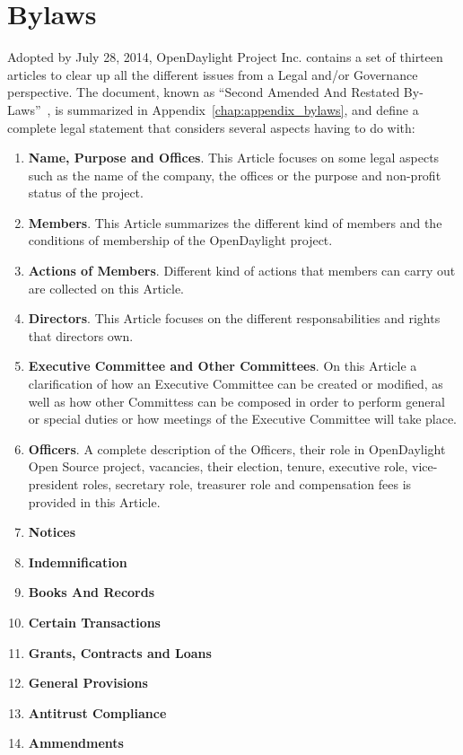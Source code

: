 \documentclass[a4paper, 12pt]{book}
\begin{document}
\section{Bylaws}
\label{sec:bylaws}
Adopted by July 28, 2014, OpenDaylight Project Inc. contains a set of thirteen articles to clear up all the different issues from a Legal and/or Governance perspective. The document, known as ``Second Amended And Restated By-Laws''~\cite{OpenDaylightBylaws}, is summarized in Appendix~\ref{chap:appendix_bylaws}, and define a complete legal statement that considers several aspects having to do with:
\begin{enumerate}\itemsep0pt
 \item{\textbf{Name, Purpose and Offices}}. This Article focuses on some legal aspects such as the name of the company, the offices or the purpose and non-profit status of the project.
 \item{\textbf{Members}}.  This Article summarizes the different kind of members and the conditions of membership of the OpenDaylight project.
 \item{\textbf{Actions of Members}}. Different kind of actions that members can carry out are collected on this Article.
 \item{\textbf{Directors}}. This Article focuses on the different responsabilities and rights that directors own.
 \item{\textbf{Executive Committee and Other Committees}}. On this Article a clarification of how an Executive Committee can be created or modified, as well as how other Committess can be composed in order to perform general or special duties or how meetings of the Executive Committee will take place.
 \item{\textbf{Officers}}. A complete description of the Officers, their role in OpenDaylight Open Source project, vacancies, their election, tenure, executive role, vice-president roles, secretary role, treasurer role and compensation fees is provided in this Article.
 \item{\textbf{Notices}}
 \item{\textbf{Indemnification}}
 \item{\textbf{Books And Records}}
 \item{\textbf{Certain Transactions}}
 \item{\textbf{Grants, Contracts and Loans}}
 \item{\textbf{General Provisions}}
 \item{\textbf{Antitrust Compliance}}
 \item{\textbf{Ammendments}}
\end{enumerate}
\end{document}

